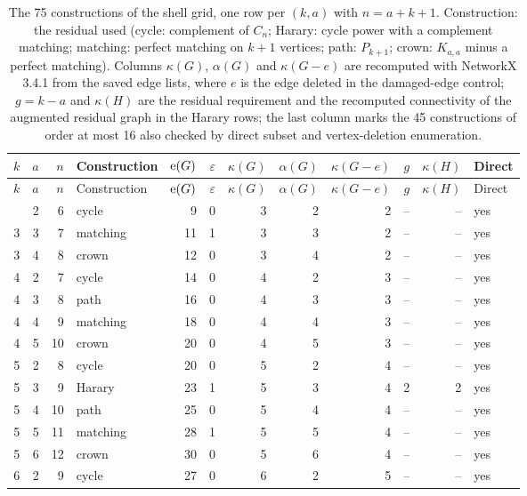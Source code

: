 {\scriptsize\setlength{\tabcolsep}{3.4pt}
\begin{longtable}{rrrlrrrrrrrl}
\caption{The 75 constructions of the shell grid, one row per $(k,a)$ with $n=a+k+1$. Construction: the residual used (cycle: complement of $C_n$; Harary: cycle power with a complement matching; matching: perfect matching on $k+1$ vertices; path: $P_{k+1}$; crown: $K_{a,a}$ minus a perfect matching). Columns $\kappa(G)$, $\alpha(G)$ and $\kappa(G-e)$ are recomputed with NetworkX 3.4.1 from the saved edge lists, where $e$ is the edge deleted in the damaged-edge control; $g=k-a$ and $\kappa(H)$ are the residual requirement and the recomputed connectivity of the augmented residual graph in the Harary rows; the last column marks the 45 constructions of order at most 16 also checked by direct subset and vertex-deletion enumeration.}\label{tab:shell75}\\
\toprule
$k$ & $a$ & $n$ & Construction & $\mathrm{e}(G)$ & $\varepsilon$ & $\kappa(G)$ & $\alpha(G)$ & $\kappa(G-e)$ & $g$ & $\kappa(H)$ & Direct\\
\midrule
\endfirsthead
\toprule
$k$ & $a$ & $n$ & Construction & $\mathrm{e}(G)$ & $\varepsilon$ & $\kappa(G)$ & $\alpha(G)$ & $\kappa(G-e)$ & $g$ & $\kappa(H)$ & Direct\\
\midrule
\endhead
\bottomrule
\endfoot
3 & 2 & 6 & cycle & 9 & 0 & 3 & 2 & 2 & -- & -- & yes\\
3 & 3 & 7 & matching & 11 & 1 & 3 & 3 & 2 & -- & -- & yes\\
3 & 4 & 8 & crown & 12 & 0 & 3 & 4 & 2 & -- & -- & yes\\
4 & 2 & 7 & cycle & 14 & 0 & 4 & 2 & 3 & -- & -- & yes\\
4 & 3 & 8 & path & 16 & 0 & 4 & 3 & 3 & -- & -- & yes\\
4 & 4 & 9 & matching & 18 & 0 & 4 & 4 & 3 & -- & -- & yes\\
4 & 5 & 10 & crown & 20 & 0 & 4 & 5 & 3 & -- & -- & yes\\
5 & 2 & 8 & cycle & 20 & 0 & 5 & 2 & 4 & -- & -- & yes\\
5 & 3 & 9 & Harary & 23 & 1 & 5 & 3 & 4 & 2 & 2 & yes\\
5 & 4 & 10 & path & 25 & 0 & 5 & 4 & 4 & -- & -- & yes\\
5 & 5 & 11 & matching & 28 & 1 & 5 & 5 & 4 & -- & -- & yes\\
5 & 6 & 12 & crown & 30 & 0 & 5 & 6 & 4 & -- & -- & yes\\
6 & 2 & 9 & cycle & 27 & 0 & 6 & 2 & 5 & -- & -- & yes\\

\end{longtable}}
